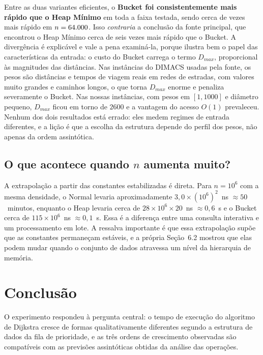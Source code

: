 \documentclass[12pt,a4paper]{article}
\begin{document}
Entre as duas variantes eficientes, o \textbf{Bucket foi consistentemente mais
rápido que o Heap Mínimo} em toda a faixa testada, sendo cerca de
\heapSobreBucket{} vezes mais rápido em $n = 64.000{}$. Isso \emph{contraria} a
conclusão da fonte principal, que encontrou o Heap Mínimo cerca de seis vezes
mais rápido que o Bucket. A divergência é explicável e vale a pena examiná-la,
porque ilustra bem o papel das características da entrada: o custo do Bucket
carrega o termo $D_{max}$, proporcional às magnitudes das distâncias. Nas
instâncias do DIMACS usadas pela fonte, os pesos são distâncias e tempos de
viagem reais em redes de estradas, com valores muito grandes e caminhos
longos, o que torna $D_{max}$ enorme e penaliza severamente o Bucket. Nas
nossas instâncias, com pesos em $[1,1000]$ e diâmetro pequeno, $D_{max}$
ficou em torno de $2600$ e a vantagem do acesso $O(1)$ prevaleceu. Nenhum dos
dois resultados está errado: eles medem regimes de entrada diferentes, e a
lição é que a escolha da estrutura depende do perfil dos pesos, não apenas
da ordem assintótica.

\subsection{O que acontece quando \texorpdfstring{$n$}{n} aumenta muito?}

A extrapolação a partir das constantes estabilizadas é direta. Para
$n = 10^6$ com a mesma densidade, o Normal levaria aproximadamente
$3{,}0 \times (10^6)^2$~ns $\approx 50$~minutos, enquanto o Heap levaria
cerca de $28 \times 10^6 \times 20$~ns $\approx 0{,}6$~s e o Bucket
cerca de $115 \times 10^6$~ns $\approx 0{,}1$~s. Essa é a diferença
entre uma consulta interativa e um processamento em lote. A ressalva
importante é que essa extrapolação supõe que as constantes permaneçam
estáveis, e a própria Seção~6.2 mostrou que elas podem mudar quando o
conjunto de dados atravessa um nível da hierarquia de memória.

\section{Conclusão}

O experimento respondeu à pergunta central: o tempo de execução do algoritmo
de Dijkstra cresce de formas qualitativamente diferentes segundo a estrutura
de dados da fila de prioridade, e as três ordens de crescimento observadas são
compatíveis com as previsões assintóticas obtidas da análise das operações.
\end{document}
